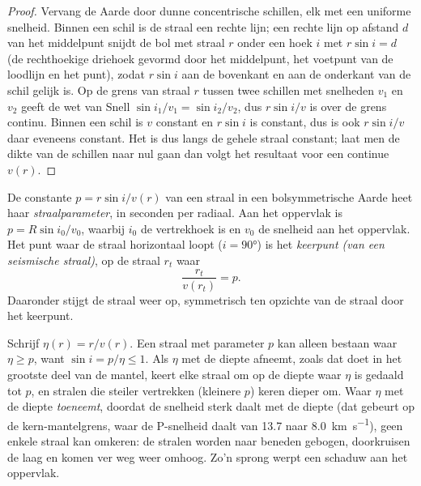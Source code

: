 \begin{proof}
Vervang de Aarde door dunne concentrische schillen, elk met een uniforme snelheid. Binnen een
schil is de straal een rechte lijn; een rechte lijn op afstand $d$ van het
middelpunt snijdt de bol met straal $r$ onder een hoek $i$ met
$r\sin i = d$ (de rechthoekige driehoek gevormd door het middelpunt, het voetpunt van de
loodlijn en het punt), zodat $r\sin i$ aan de bovenkant en aan de
onderkant van de schil gelijk is. Op de grens van straal $r$ tussen twee schillen met
snelheden $v_1$ en $v_2$ geeft de wet van Snell $\sin i_1/v_1 = \sin i_2/v_2$, dus
$r\sin i/v$ is over de grens continu. Binnen een schil is $v$ constant en
$r\sin i$ is constant, dus is ook $r\sin i/v$ daar eveneens constant. Het is dus
langs de gehele straal constant; laat men de dikte van de schillen naar nul gaan
dan volgt het resultaat voor een continue $v(r)$.
\end{proof}

\begin{definition}\label{def:b3:seismology-imaging:ray-parameter}
De constante $p = r\sin i/v(r)$ van een straal in een bolsymmetrische Aarde heet
haar \emph{straalparameter}, in seconden per radiaal. Aan het
oppervlak is $p = R\sin i_0/v_0$, waarbij $i_0$ de vertrekhoek is en $v_0$
de snelheid aan het oppervlak. Het punt waar de straal horizontaal loopt ($i = \ang{90}$)
is het \emph{keerpunt (van een seismische straal)},
op de straal $r_t$ waar
\[
  \frac{r_t}{v(r_t)} = p .
\]
Daaronder stijgt de straal weer op, symmetrisch ten opzichte van de straal door het
keerpunt.
\end{definition}

Schrijf $\eta(r) = r/v(r)$. Een straal met parameter $p$ kan alleen bestaan waar
$\eta \ge p$, want $\sin i = p/\eta \le 1$. Als $\eta$ met de diepte afneemt, zoals
dat doet in het grootste deel van de mantel, keert elke straal om op de diepte waar $\eta$
is gedaald tot $p$, en stralen die steiler vertrekken (kleinere $p$) keren dieper om.
Waar $\eta$ met de diepte \emph{toeneemt}, doordat de snelheid sterk daalt met
de diepte (dat gebeurt op de kern-mantelgrens, waar de P-snelheid daalt van
13.7 naar \qty{8.0}{km.s^{-1}}), %
geen enkele straal kan omkeren: de stralen worden naar beneden gebogen, doorkruisen de laag en komen ver weg weer omhoog.
Zo'n sprong werpt een schaduw aan het oppervlak.


